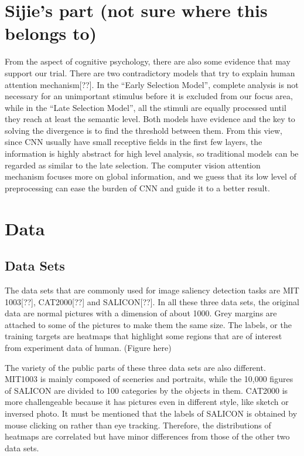 \documentclass[12pt]{article}
\begin{document}
\section{Sijie's part (not sure where this belongs to)}
From the aspect of cognitive psychology, there are also some evidence that may support our trial. There are two contradictory models that try to explain human attention mechanism[??]. 
In the “Early Selection Model”, complete analysis is not necessary for an unimportant stimulus before it is excluded from our focus area, while in the “Late Selection Model”, all the stimuli are equally processed until they reach at least the semantic level. 
Both models have evidence and the key to solving the divergence is to find the threshold between them. From this view, since CNN usually have small receptive fields in the first few layers, the information is highly abstract for high level analysis, so traditional models can be regarded as similar to the late selection. 
The computer vision attention mechanism focuses more on global information, and we guess that its low level of preprocessing can ease the burden of CNN and guide it to a better result.

\section{Data}
\subsection{Data Sets}
The data sets that are commonly used for image saliency detection tasks are MIT 1003[??], CAT2000[??] and SALICON[??].
In all these three data sets, the original data are normal pictures with a dimension of about 1000. Grey margins are attached to some of the pictures to make them the same size. 
The labels, or the training targets are heatmaps that highlight some regions that are of interest from experiment data of human.
(Figure here)

The variety of the public parts of these three data sets are also different. MIT1003 is mainly composed of sceneries and portraits, while the 10,000 figures of SALICON are divided to 100 categories by the objects in them. CAT2000 is more challengeable because it has pictures even in different style, like sketch or inversed photo. 
It must be mentioned that the labels of SALICON is obtained by mouse clicking on rather than eye tracking. Therefore, the distributions of heatmaps are correlated but have minor differences from those of the other two data sets.
\end{document}
